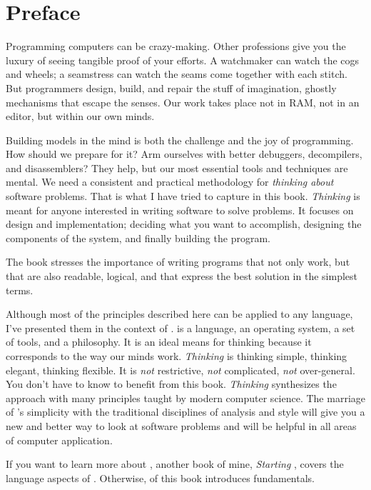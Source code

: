 \chapter*{Preface}
\pagestyle{headings}

\initial Programming computers can be crazy-making. Other professions give
you the luxury of seeing tangible proof of your efforts. A watchmaker
can watch the cogs and wheels; a seamstress can watch the seams come
together with each stitch. But programmers design, build, and repair
the stuff of imagination, ghostly mechanisms that escape the senses.
Our work takes place not in RAM, not in an editor, but within our
own minds.

Building models in the mind is both the challenge and the joy of programming.
How should we prepare for it? Arm ourselves with better debuggers,
decompilers, and disassemblers? They help, but our most essential
tools and techniques are mental. We need a consistent and practical
methodology for \emph{thinking about} software problems. That is what
I have tried to capture in this book. \emph{Thinking \Forth{}} is meant
for anyone interested in writing software to solve problems. It focuses
on design and implementation; deciding what you want to accomplish,
designing the components of the system, and finally building the program.

The book stresses the importance of writing programs that not only
work, but that are also readable, logical, and that express the best
solution in the simplest terms.

Although most of the principles described here can be applied to any
language, I've presented them in the context of \Forth{}. \Forth{} is
a language, an operating system, a set of tools, and a philosophy. It
is an ideal means for thinking because it corresponds to the way our
minds work. \emph{Thinking \Forth{}} is thinking simple, thinking
elegant, thinking flexible. It is \emph{not} restrictive, \emph{not}
complicated, \emph{not} over-general.  You don't have to know \Forth{}
to benefit from this book. \emph{Thinking \Forth{}} synthesizes the
\Forth{} approach with many principles taught by modern computer
science. The marriage of \Forth{}'s simplicity with the traditional
disciplines of analysis and style will give you a new and better way
to look at software problems and will be helpful in all areas of
computer application.

If you want to learn more about \Forth{}, another book of mine,
\emph{Starting \Forth{}}, covers the language aspects of
\Forth{}. Otherwise,  of this book introduces \Forth{} fundamentals.

